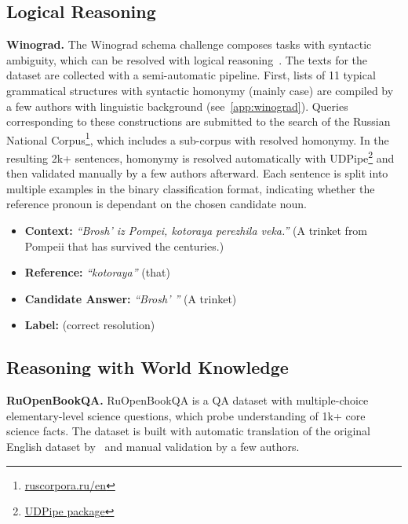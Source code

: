 \documentclass[11pt]{article}
\begin{document}
\subsection{Logical Reasoning}
\label{winograd}
\noindent\textbf{Winograd.} The Winograd schema challenge composes tasks with syntactic ambiguity, which can be resolved with logical reasoning~\cite{levesque2012winograd}. The texts for the dataset are collected with a semi-automatic pipeline. First, lists of 11 typical grammatical structures with syntactic homonymy (mainly case) are compiled by a few authors with linguistic background (see~\autoref{app:winograd}). Queries corresponding to these constructions are submitted to the search of the Russian National Corpus\footnote{\href{https://ruscorpora.ru/old/en/index.html}{ruscorpora.ru/en}}, which includes a sub-corpus with resolved homonymy. In the resulting 2k+ sentences, homonymy is resolved automatically with UDPipe\footnote{\href{https://cran.r-project.org/web/packages/udpipe/vignettes/udpipe-annotation.html}{UDPipe package}} and then validated manually by a few authors afterward. Each sentence is split into multiple examples in the binary classification format, indicating whether the reference pronoun is dependant on the chosen candidate noun.

\begin{itemize}[noitemsep,leftmargin=1.em]
\item \textbf{Context:} \textit{``Brosh' iz Pompei, kotoraya perezhila veka.''} (A trinket from Pompeii that has survived the centuries.)
\item \textbf{Reference:} \textit{``kotoraya''} (that)\item \textbf{Candidate Answer:} \textit{``Brosh' ''} (A trinket) \item \textbf{Label:} \cmark (correct resolution)\end{itemize}
 
\subsection{Reasoning with World Knowledge}
\label{multiple_choice}
\noindent\textbf{RuOpenBookQA.} RuOpenBookQA is a QA dataset with multiple-choice elementary-level science questions, which probe understanding of 1k+ core science facts. The dataset is built with automatic translation of the original English dataset by~\citet{mihaylov-etal-2018-suit} and manual validation by a few authors.
\end{document}
